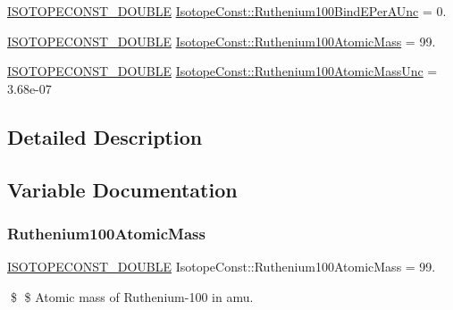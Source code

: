 \begin{DoxyCompactItemize}
\mbox{\hyperlink{group___isotope_const-_macros_ga8f45a7272ce02c0b4c65c44636ed719a}{I\+S\+O\+T\+O\+P\+E\+C\+O\+N\+S\+T\+\_\+\+D\+O\+U\+B\+LE}} \mbox{\hyperlink{group___isotope_const-_ruthenium-_ru100_ga713b38ad4996301b98e154fe6fcd0eb9}{Isotope\+Const\+::\+Ruthenium100\+Bind\+E\+Per\+A\+Unc}} = 0.
\item 
\mbox{\hyperlink{group___isotope_const-_macros_ga8f45a7272ce02c0b4c65c44636ed719a}{I\+S\+O\+T\+O\+P\+E\+C\+O\+N\+S\+T\+\_\+\+D\+O\+U\+B\+LE}} \mbox{\hyperlink{group___isotope_const-_ruthenium-_ru100_ga0a602d16cbe5d18155e2811de4792e59}{Isotope\+Const\+::\+Ruthenium100\+Atomic\+Mass}} = 99.
\item 
\mbox{\hyperlink{group___isotope_const-_macros_ga8f45a7272ce02c0b4c65c44636ed719a}{I\+S\+O\+T\+O\+P\+E\+C\+O\+N\+S\+T\+\_\+\+D\+O\+U\+B\+LE}} \mbox{\hyperlink{group___isotope_const-_ruthenium-_ru100_ga0d7530e760e47d6ecfba42f2b6053994}{Isotope\+Const\+::\+Ruthenium100\+Atomic\+Mass\+Unc}} = 3.\+68e-\/07
\end{DoxyCompactItemize}


\subsection{Detailed Description}


\subsection{Variable Documentation}
\mbox{\label{group___isotope_const-_ruthenium-_ru100_ga0a602d16cbe5d18155e2811de4792e59}} 
\subsubsection{\texorpdfstring{Ruthenium100\+Atomic\+Mass}{Ruthenium100AtomicMass}}
{\footnotesize\ttfamily \mbox{\hyperlink{group___isotope_const-_macros_ga8f45a7272ce02c0b4c65c44636ed719a}{I\+S\+O\+T\+O\+P\+E\+C\+O\+N\+S\+T\+\_\+\+D\+O\+U\+B\+LE}} Isotope\+Const\+::\+Ruthenium100\+Atomic\+Mass = 99.}

\$ \$ Atomic mass of Ruthenium-\/100 in amu. \mbox{\label{group___isotope_const-_ruthenium-_ru100_ga0d7530e760e47d6ecfba42f2b6053994}} 

